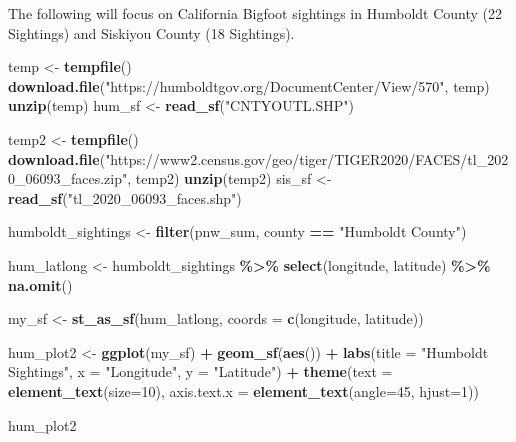 \documentclass[
]{article}
\newenvironment{Shaded}{\begin{snugshade}}{\end{snugshade}}
\newcommand{\AttributeTok}[1]{\textcolor[rgb]{0.13,0.29,0.53}{#1}}
\newcommand{\DecValTok}[1]{\textcolor[rgb]{0.00,0.00,0.81}{#1}}
\newcommand{\FunctionTok}[1]{\textcolor[rgb]{0.13,0.29,0.53}{\textbf{#1}}}
\newcommand{\NormalTok}[1]{#1}
\newcommand{\OtherTok}[1]{\textcolor[rgb]{0.56,0.35,0.01}{#1}}
\newcommand{\SpecialCharTok}[1]{\textcolor[rgb]{0.81,0.36,0.00}{\textbf{#1}}}
\newcommand{\StringTok}[1]{\textcolor[rgb]{0.31,0.60,0.02}{#1}}
\begin{document}
The following will focus on California Bigfoot sightings in Humboldt
County (22 Sightings) and Siskiyou County (18 Sightings).

\begin{Shaded}
\begin{Highlighting}[]
\NormalTok{temp }\OtherTok{\textless{}{-}} \FunctionTok{tempfile}\NormalTok{()}
\FunctionTok{download.file}\NormalTok{(}\StringTok{"https://humboldtgov.org/DocumentCenter/View/570"}\NormalTok{, temp)}
\FunctionTok{unzip}\NormalTok{(temp)}
\NormalTok{hum\_sf }\OtherTok{\textless{}{-}} \FunctionTok{read\_sf}\NormalTok{(}\StringTok{"CNTYOUTL.SHP"}\NormalTok{)}

\NormalTok{temp2 }\OtherTok{\textless{}{-}} \FunctionTok{tempfile}\NormalTok{()}
\FunctionTok{download.file}\NormalTok{(}\StringTok{"https://www2.census.gov/geo/tiger/TIGER2020/FACES/tl\_2020\_06093\_faces.zip"}\NormalTok{, temp2)}
\FunctionTok{unzip}\NormalTok{(temp2)}
\NormalTok{sis\_sf }\OtherTok{\textless{}{-}} \FunctionTok{read\_sf}\NormalTok{(}\StringTok{"tl\_2020\_06093\_faces.shp"}\NormalTok{)}
\end{Highlighting}
\end{Shaded}

\begin{Shaded}
\begin{Highlighting}[]
\NormalTok{humboldt\_sightings }\OtherTok{\textless{}{-}} \FunctionTok{filter}\NormalTok{(pnw\_sum, county }\SpecialCharTok{==} \StringTok{"Humboldt County"}\NormalTok{)}

\NormalTok{hum\_latlong }\OtherTok{\textless{}{-}}\NormalTok{ humboldt\_sightings }\SpecialCharTok{\%\textgreater{}\%} \FunctionTok{select}\NormalTok{(longitude, latitude) }\SpecialCharTok{\%\textgreater{}\%} \FunctionTok{na.omit}\NormalTok{()}

\NormalTok{my\_sf }\OtherTok{\textless{}{-}} \FunctionTok{st\_as\_sf}\NormalTok{(hum\_latlong, }\AttributeTok{coords =} \FunctionTok{c}\NormalTok{(}\StringTok{\textquotesingle{}longitude\textquotesingle{}}\NormalTok{, }\StringTok{\textquotesingle{}latitude\textquotesingle{}}\NormalTok{))}

\NormalTok{hum\_plot2 }\OtherTok{\textless{}{-}} \FunctionTok{ggplot}\NormalTok{(my\_sf) }\SpecialCharTok{+} 
  \FunctionTok{geom\_sf}\NormalTok{(}\FunctionTok{aes}\NormalTok{()) }\SpecialCharTok{+} \FunctionTok{labs}\NormalTok{(}\AttributeTok{title =} \StringTok{"Humboldt Sightings"}\NormalTok{, }\AttributeTok{x =} \StringTok{"Longitude"}\NormalTok{, }\AttributeTok{y =} \StringTok{"Latitude"}\NormalTok{) }\SpecialCharTok{+} \FunctionTok{theme}\NormalTok{(}\AttributeTok{text =} \FunctionTok{element\_text}\NormalTok{(}\AttributeTok{size=}\DecValTok{10}\NormalTok{),}
        \AttributeTok{axis.text.x =} \FunctionTok{element\_text}\NormalTok{(}\AttributeTok{angle=}\DecValTok{45}\NormalTok{, }\AttributeTok{hjust=}\DecValTok{1}\NormalTok{)) }

\NormalTok{hum\_plot2}
\end{Highlighting}
\end{Shaded}
\end{document}
